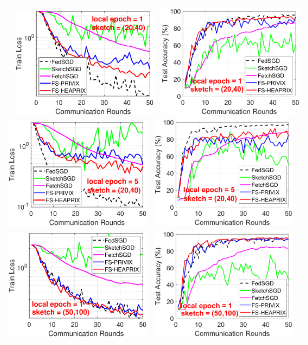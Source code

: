 \documentclass[11pt]{article}
\begin{document}
\begin{figure}[t]
	\begin{center}
		\mbox{\hspace{-0.15in}			   
		\includegraphics[width=1.45in]{MNIST_figures/local1_sketch20_iid0_train_loss.eps} \hspace{-0.12in}
		\includegraphics[width=1.45in]{MNIST_figures/local1_sketch20_iid0_test_acc.eps} 
		\includegraphics[width=1.45in]{MNIST_figures/local5_sketch20_iid0_train_loss.eps} \hspace{-0.12in}
		\includegraphics[width=1.45in]{MNIST_figures/local5_sketch20_iid0_test_acc.eps}
		}
		\mbox{\hspace{-0.15in}	
		 \includegraphics[width=1.45in]{MNIST_figures/local1_sketch50_iid0_train_loss.eps} \hspace{-0.12in}
		\includegraphics[width=1.45in]{MNIST_figures/local1_sketch50_iid0_test_acc.eps} 
}
\end{center}
\end{figure}
\end{document}
